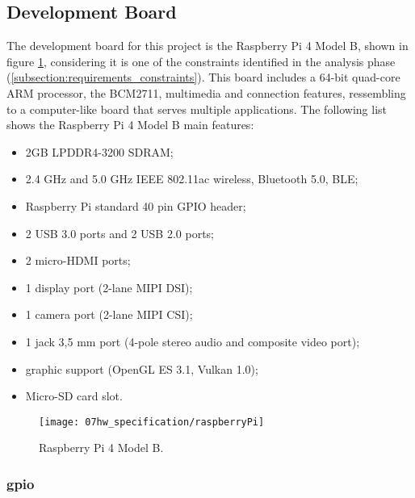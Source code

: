 \subsection{Development Board}

The development board for this project is the Raspberry Pi 4 Model B, shown in figure \ref{fig:rasp}, considering it is one of the constraints identified in the analysis phase (\ref{subsection:requirements_constraints}). This board includes a 64-bit quad-core ARM processor, the BCM2711, multimedia and connection features, ressembling to a computer-like board that serves multiple applications. The following list shows the Raspberry Pi 4 Model B main features:

\begin{itemize}
        \item 2GB LPDDR4-3200 SDRAM;
        \item 2.4 GHz and 5.0 GHz IEEE 802.11ac wireless, Bluetooth 5.0, BLE;
        \item Raspberry Pi standard 40 pin GPIO header;   
        \item 2 USB 3.0 ports and 2 USB 2.0 ports;
        \item 2 micro-HDMI ports;
        \item 1 display port (2-lane MIPI DSI);
        \item 1 camera port (2-lane MIPI CSI);
        \item 1 jack 3,5 mm port (4-pole stereo audio and composite video port);
		\item graphic support (OpenGL ES 3.1, Vulkan 1.0);
		\item Micro-SD card slot.
\end{itemize}



\begin{figure}[ht]
	\centering
	\texttt{[image: 07hw\_specification/raspberryPi]}
	\caption{Raspberry Pi 4 Model B.}
	\label{fig:rasp}
\end{figure}

\subsubsection{\ac{gpio}}

